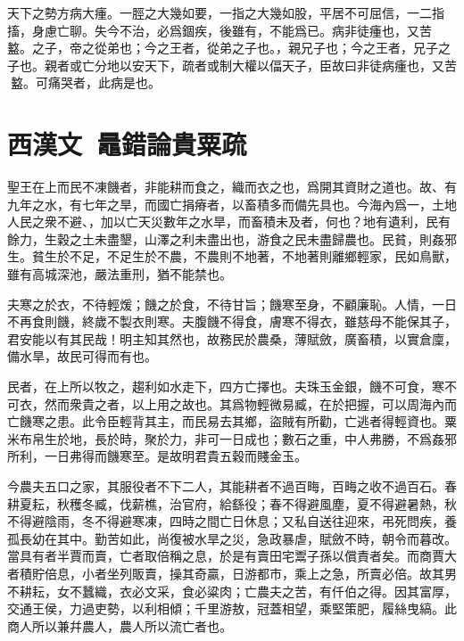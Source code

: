 天下之勢方病大瘇。一脛之大幾如要，一指之大幾如股，平居不可屈信，一二指搐，身慮亡聊。失今不治，必爲錮疾，後雖有，不能爲已。病非徒瘇也，又苦{\selectfont 𨂂}盭。之子，帝之從弟也；今之王者，從弟之子也。，親兄子也；今之王者，兄子之子也。親者或亡分地以安天下，疏者或制大權以偪天子，臣故曰非徒病瘇也，又苦{\selectfont 𨂂}盭。可痛哭者，此病是也。 

\theendnotes

\section[鼂錯論貴粟疏\quad{\small 西漢文}]{{\normalsize 西漢文\ 鼂錯}\quad 論貴粟疏}
聖王在上而民不凍饑者，非能耕而食之，織而衣之也，爲開其資財之道也。故、有九年之水，有七年之旱，而國亡捐瘠者，以畜積多而備先具也。今海內爲一，土地人民之衆不避、，加以亡天災數年之水旱，而畜積未及者，何也？地有遺利，民有餘力，生穀之土未盡墾，山澤之利未盡出也，游食之民未盡歸農也。民貧，則姦邪生。貧生於不足，不足生於不農，不農則不地著，不地著則離鄉輕家，民如鳥獸，雖有高城深池，嚴法重刑，猶不能禁也。

夫寒之於衣，不待輕煖；饑之於食，不待甘旨；饑寒至身，不顧廉恥。人情，一日不再食則饑，終歲不製衣則寒。夫腹饑不得食，膚寒不得衣，雖慈母不能保其子，君安能以有其民哉！明主知其然也，故務民於農桑，薄賦斂，廣畜積，以實倉廩，備水旱，故民可得而有也。

民者，在上所以牧之，趨利如水走下，四方亡擇也。夫珠玉金銀，饑不可食，寒不可衣，然而衆貴之者，以上用之故也。其爲物輕微易臧，在於把握，可以周海內而亡饑寒之患。此令臣輕背其主，而民易去其鄉，盜賊有所勸，亡逃者得輕資也。粟米布帛生於地，長於時，聚於力，非可一日成也；數石之重，中人弗勝，不爲姦邪所利，一日弗得而饑寒至。是故明君貴五穀而賤金玉。

今農夫五口之家，其服役者不下二人，其能耕者不過百畮，百畮之收不過百石。春耕夏耘，秋穫冬臧，伐薪樵，治官府，給繇役；春不得避風塵，夏不得避暑熱，秋不得避陰雨，冬不得避寒凍，四時之間亡日休息；又私自送往迎來，弔死問疾，養孤長幼在其中。勤苦如此，尚復被水旱之災，急政暴虐，賦斂不時，朝令而暮改。當具有者半賈而賣，亡者取倍稱之息，於是有賣田宅鬻子孫以償責者矣。而商賈大者積貯倍息，小者坐列販賣，操其奇贏，日游都市，乘上之急，所賣必倍。故其男不耕耘，女不蠶織，衣必文采，食必粱肉；亡農夫之苦，有仟伯之得。因其富厚，交通王侯，力過吏勢，以利相傾；千里游敖，冠蓋相望，乘堅策肥，履絲曳縞。此商人所以兼幷農人，農人所以流亡者也。

